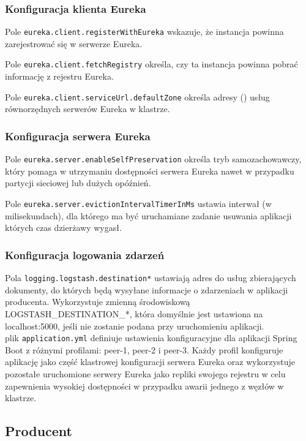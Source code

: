 \subsubsection{Konfiguracja klienta Eureka}

Pole \verb|eureka.client.registerWithEureka| wskazuje, że instancja powinna zarejestrować się w serwerze Eureka.

Pole \verb|eureka.client.fetchRegistry| określa, czy ta instancja powinna pobrać informację z rejestru Eureka.

Pole \verb|eureka.client.serviceUrl.defaultZone| określa adresy  () usług równorzędnych serwerów Eureka w klastrze.

\subsubsection{Konfiguracja serwera Eureka}

Pole \verb|eureka.server.enableSelfPreservation| określa tryb samozachowawczy, który pomaga w utrzymaniu dostępności serwera Eureka nawet w przypadku partycji sieciowej lub dużych opóźnień.

Pole \verb|eureka.server.evictionIntervalTimerInMs| ustawia interwał (w milisekundach), dla którego ma być uruchamiane zadanie usuwania aplikacji których czas dzierżawy wygasł.

\subsubsection{Konfiguracja logowania zdarzeń}

Pola \verb|logging.logstash.destination*| ustawiają adres do usług zbierających dokumenty, do których będą wysyłane informacje o zdarzeniach w aplikacji producenta. Wykorzystuje zmienną środowiskową LOGSTASH\_DESTINATION\_*, która domyślnie jest ustawiona na localhost:5000, jeśli nie zostanie podana przy uruchomieniu aplikacji.\\[0.5cm]

plik \verb|application.yml| definiuje ustawienia konfiguracyjne dla aplikacji Spring Boot z różnymi profilami: peer-1, peer-2 i peer-3. Każdy profil konfiguruje aplikację jako część klastrowej konfiguracji serwera Eureka oraz wykorzystuje pozostałe uruchomione serwery Eureka jako repliki swojego rejestru w celu zapewnienia wysokiej dostępności w przypadku awarii jednego z węzłów w klastrze.

\subsection{Producent}

